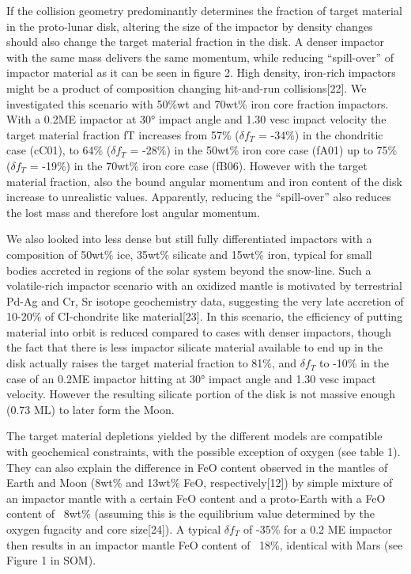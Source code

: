 If the collision geometry predominantly determines the fraction of target material in the proto-lunar disk, altering the size of the impactor by density changes should also change the target material fraction in the disk. A denser impactor with the same mass delivers the same momentum, while reducing “spill-over” of impactor material as it can be seen in figure 2. High density, iron-rich impactors might be a product of composition changing hit-and-run collisions[22]. We investigated this scenario with 50\%wt and 70wt\% iron core fraction impactors. With a 0.2ME impactor at 30° impact angle and 1.30 vesc impact velocity the target material fraction fT increases from 57\% ($\delta f_{T}$ = -34\%) in the chondritic case (cC01), to 64\% ($\delta f_{T}$ = -28\%) in the 50wt\% iron core case (fA01) up to 75\% ($\delta f_{T}$ = -19\%) in the 70wt\% iron core case (fB06). However with the target material fraction, also the bound angular momentum and iron content of the disk increase to unrealistic values. Apparently, reducing the “spill-over” also reduces the lost mass and therefore lost angular momentum. 

We also looked into less dense but still fully differentiated impactors with a composition of 50wt\% ice, 35wt\% silicate and 15wt\% iron, typical for small bodies accreted in regions of the solar system beyond the snow-line. Such a volatile-rich impactor scenario with an oxidized mantle is motivated  by terrestrial Pd-Ag and Cr, Sr isotope geochemistry data, suggesting the very late accretion of 10-20\% of CI-chondrite like material[23]. In this scenario, the efficiency of putting material into orbit is reduced compared to cases with denser impactors, though the fact that there is less impactor silicate material available to end up in the disk actually raises the target material fraction to 81\%, and $\delta f_{T}$ to -10\% in the case of an 0.2ME impactor hitting at 30° impact angle and 1.30 vesc impact velocity. However the resulting silicate portion of the disk is not massive enough (0.73 ML) to later form the Moon.  

The target material depletions yielded by the different models are compatible with geochemical constraints, with the possible exception of oxygen (see table 1). They can also explain the difference in FeO content observed in the mantles of Earth and Moon (8wt\% and 13wt\% FeO, respectively[12]) by simple mixture of an impactor mantle with a certain FeO content and a proto-Earth with a FeO content of ~8wt\% (assuming this is the equilibrium value determined by the oxygen fugacity and core size[24]). A typical $\delta f_{T}$ of -35\% for a 0.2 ME impactor then results in an impactor mantle FeO content of ~18\%, identical with Mars (see Figure 1 in SOM).

